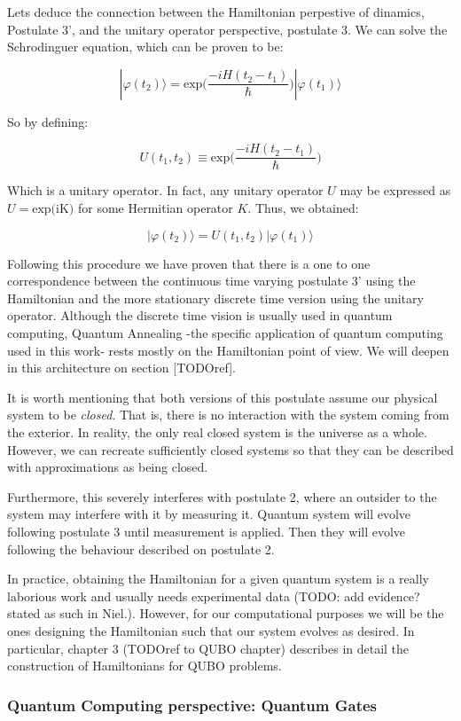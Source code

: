 Lets deduce the connection between the Hamiltonian perpestive of dinamics, Postulate 3', and the unitary operator perspective, postulate 3. We can solve the Schrodinguer equation, which can be proven to be:

$$ |\varphi(t_2)\rangle = \text{exp} \bigg(  \frac{-iH(t_2-t_1)}{\hbar} \bigg) |\varphi(t_1)\rangle $$

So by defining:

$$ U(t_1, t_2) \equiv \text{exp} \bigg(  \frac{-iH(t_2-t_1)}{\hbar} \bigg) $$

Which is a unitary operator. In fact, any unitary operator $U$ may be expressed as $U = \text{exp(iK)}$ for some Hermitian operator $K$. Thus, we obtained: 

$$ |\varphi(t_2)\rangle = U(t_1, t_2) |\varphi(t_1)\rangle $$

Following this procedure we have proven that there is a one to one correspondence between the continuous time varying postulate 3' using the Hamiltonian and the more stationary discrete time version using the unitary operator. Although the discrete time vision is usually used in quantum computing, Quantum Annealing -the specific application of quantum computing used in this work- rests mostly on the Hamiltonian point of view. We will deepen in this architecture on section [TODOref].

It is worth mentioning that both versions of this postulate assume our physical system to be \emph{closed}. That is, there is no interaction with the system coming from the exterior. In reality, the only real closed system is the universe as a whole. However, we can recreate sufficiently closed systems so that they can be described with approximations as being closed. 

Furthermore, this severely interferes with postulate 2, where an outsider to the system may interfere with it by measuring it. Quantum system will evolve following postulate 3 until measurement is applied. Then they will evolve following the behaviour described on postulate 2.

In practice, obtaining the Hamiltonian for a given quantum system is a really laborious work and usually needs experimental data (TODO: add evidence? stated as such in Niel.). However, for our computational purposes we will be the ones designing the Hamiltonian such that our system evolves as desired. In particular, chapter 3 (TODOref to QUBO chapter) describes in detail the construction of Hamiltonians for QUBO problems.

\subsubsection{Quantum Computing perspective: Quantum Gates}

